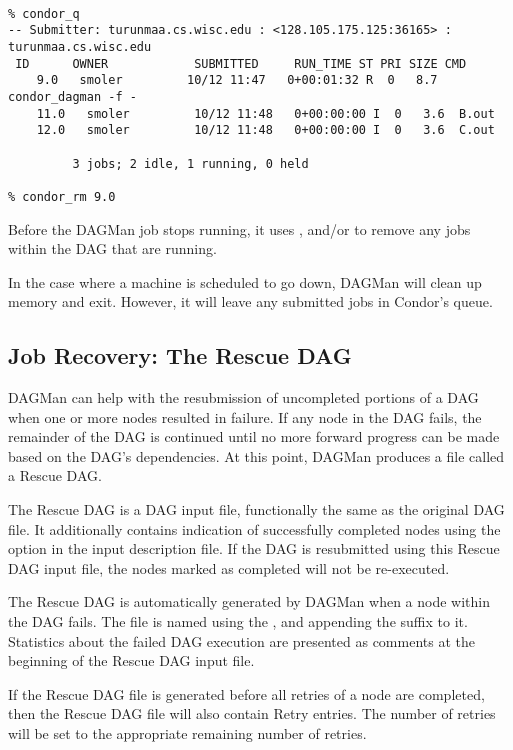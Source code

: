 \footnotesize
\begin{verbatim}

% condor_q
-- Submitter: turunmaa.cs.wisc.edu : <128.105.175.125:36165> : turunmaa.cs.wisc.edu
 ID      OWNER            SUBMITTED     RUN_TIME ST PRI SIZE CMD
    9.0   smoler         10/12 11:47   0+00:01:32 R  0   8.7  condor_dagman -f -
    11.0   smoler         10/12 11:48   0+00:00:00 I  0   3.6  B.out
    12.0   smoler         10/12 11:48   0+00:00:00 I  0   3.6  C.out

         3 jobs; 2 idle, 1 running, 0 held

% condor_rm 9.0
\end{verbatim}
\normalsize

Before the DAGMan job stops running, it uses , and/or
to remove any jobs within the DAG that are running.

In the case where a
machine is scheduled to go down,
DAGMan will clean up memory and exit.
However, it will leave any submitted jobs
in Condor's queue.

\subsection{Job Recovery:  The Rescue DAG}

DAGMan can help with the resubmission of uncompleted
portions of a DAG when one or more nodes resulted in failure.
If any node in the DAG fails,
the remainder of the DAG is continued until no more forward
progress can be made based on the DAG's dependencies.
At this point, DAGMan produces a file
called a Rescue DAG.

The Rescue DAG is a DAG input file,
functionally the same as the original DAG file.
It additionally contains indication of
successfully completed nodes using the 
option in the input description file.
If the DAG is resubmitted using this Rescue DAG input file,
the nodes marked as completed will not be re-executed.

The Rescue DAG is automatically generated by DAGMan when a node
within the DAG fails.
The file is named using the , and appending
the suffix  to it.
Statistics about the failed DAG execution are presented as
comments at the beginning of the Rescue DAG input file.

If the Rescue DAG file is generated before all retries
of a node are completed, 
then the Rescue DAG file will also contain Retry entries.
The number of retries will be set to the appropriate remaining
number of retries. 



